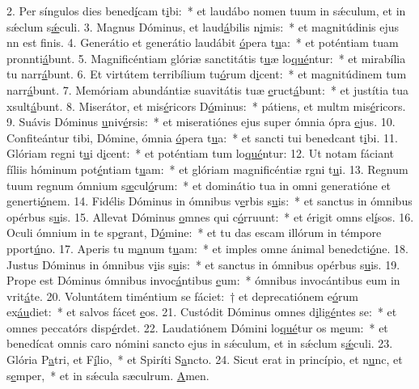 2. Per síngulos dies bened\uline{í}cam t\uline{i}bi:~* et laudábo nomen tuum in sǽculum, et in sǽclum s\uline{ǽ}culi.
3. Magnus Dóminus, et laud\uline{á}bilis n\uline{i}mis:~* et magnitúdinis ejus nn est f\uline{i}nis.
4. Generátio et generátio laudábit \uline{ó}pera t\uline{u}a:~* et poténtiam tuam pronnti\uline{á}bunt.
5. Magnificéntiam glóriæ sanctitátis t\uline{u}æ lo\uline{qué}ntur:~* et mirabília tu narr\uline{á}bunt.
6. Et virtútem terribílium tu\uline{ó}rum d\uline{i}cent:~* et magnitúdinem tum narr\uline{á}bunt.
7. Memóriam abundántiæ suavitátis tuæ \uline{e}ruct\uline{á}bunt:~* et justítia tua xsult\uline{á}bunt.
8. Miserátor, et mis\uline{é}ricors D\uline{ó}minus:~* pátiens, et multm mis\uline{é}ricors.
9. Suávis Dóminus \uline{u}niv\uline{é}rsis:~* et miseratiónes ejus super ómnia ópra \uline{e}jus.
10. Confiteántur tibi, Dómine, ómnia \uline{ó}pera t\uline{u}a:~* et sancti tui benedcant t\uline{i}bi.
11. Glóriam regni t\uline{u}i d\uline{i}cent:~* et poténtiam tum lo\uline{qué}ntur:
12. Ut notam fáciant fíliis hóminum pot\uline{é}ntiam t\uline{u}am:~* et glóriam magnificéntiæ rgni t\uline{u}i.
13. Regnum tuum regnum ómnium s\uline{æ}cul\uline{ó}rum:~* et dominátio tua in omni generatióne et generti\uline{ó}nem.
14. Fidélis Dóminus in ómnibus v\uline{e}rbis s\uline{u}is:~* et sanctus in ómnibus opérbus s\uline{u}is.
15. Allevat Dóminus \uline{o}mnes qui c\uline{ó}rruunt:~* et érigit omns el\uline{í}sos.
16. Oculi ómnium in te sp\uline{e}rant, D\uline{ó}mine:~* et tu das escam illórum in témpore pport\uline{ú}no.
17. Aperis tu m\uline{a}num t\uline{u}am:~* et imples omne ánimal benedcti\uline{ó}ne.
18. Justus Dóminus in ómnibus v\uline{i}is s\uline{u}is:~* et sanctus in ómnibus opérbus s\uline{u}is.
19. Prope est Dóminus ómnibus invoc\uline{á}ntibus \uline{e}um:~* ómnibus invocántibus eum in vrit\uline{á}te.
20. Voluntátem timéntium se fáciet:~† et deprecatiónem e\uline{ó}rum ex\uline{áu}diet:~* et salvos fácet \uline{e}os.
21. Custódit Dóminus omnes d\uline{i}lig\uline{é}ntes se:~* et omnes peccatórs disp\uline{é}rdet.
22. Laudatiónem Dómini lo\uline{qué}tur os m\uline{e}um:~* et benedícat omnis caro nómini sancto ejus in sǽculum, et in sǽclum s\uline{ǽ}culi.
23. Glória P\uline{a}tri, et F\uline{í}lio,~* et Spiríti S\uline{a}ncto.
24. Sicut erat in princípio, et n\uline{u}nc, et s\uline{e}mper,~* et in sǽcula sæculrum. \uline{A}men.
